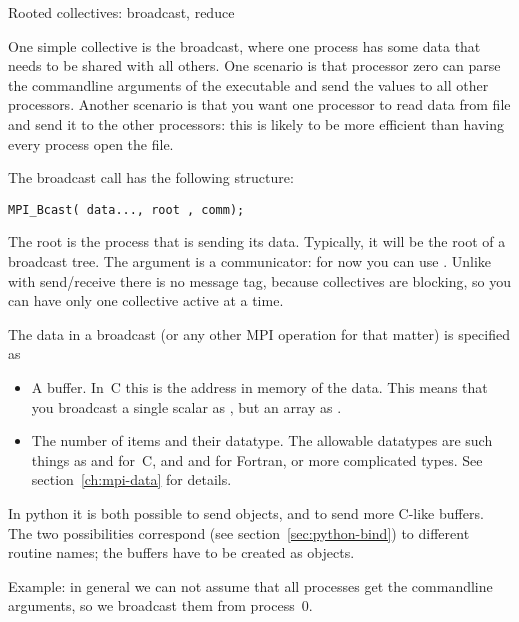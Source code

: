 
 {Rooted collectives: broadcast, reduce}
\label{sec:bcast}

One simple collective is the broadcast, where one process has some
data that needs to be shared with all others. One scenario is that
processor zero can parse the commandline arguments of the executable
and send the values to all other processors.
Another scenario is that you want one processor to read data from file
and send it to the other processors: this is likely to be more efficient
than having every process open the file.

The broadcast call has the following structure:
\begin{verbatim}
MPI_Bcast( data..., root , comm);
\end{verbatim}
The root is the process that is sending its data.
Typically, it will be the root of a broadcast tree.
The  argument is a communicator:
for now you can use .
Unlike with send/receive there is no message tag,
because collectives are blocking, so you can have only one collective active at a
time. 

The data in a broadcast (or any other MPI operation for that matter)
is specified as
\begin{itemize}
\item A buffer. In~C this is the address in memory of the data. This means
  that you broadcast a single scalar as ,
  but an array as .
\item The number of items and their datatype. The allowable datatypes
  are such things as  and  for~C, and
   and  for Fortran, or more complicated types.
  See section~\ref{ch:mpi-data} for details.
\end{itemize}
\begin{pythonnote}
  In python it is both possible to send objects, and to send more
  C-like buffers. The two possibilities correspond (see
  section~\ref{sec:python-bind}) to different routine names; the
  buffers have to be created as  objects.
\end{pythonnote}
%
Example: in general we can not assume that all processes get the
commandline arguments, so we broadcast them from process~0.

